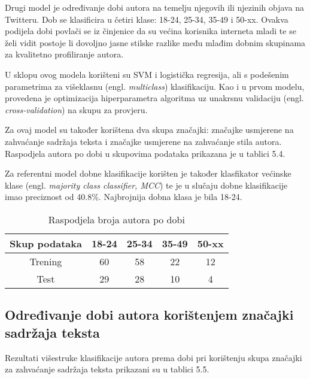 \documentclass[times, utf8, zavrsni]{fer}
\begin{document}
Drugi model je određivanje dobi autora na temelju njegovih ili njezinih objava na Twitteru. Dob se klasificira u četiri klase: 18-24, 25-34, 35-49 i 50-xx. Ovakva podijela dobi povlači se iz činjenice da su većina korisnika interneta mladi te se želi vidit postoje li dovoljno jasne stilske razlike među mlađim dobnim skupinama za kvalitetno profiliranje autora.

 U sklopu ovog modela korišteni su SVM i logistička regresija, ali s podešenim parametrima za višeklasnu (engl. \textit{multiclass}) klasifikaciju. Kao i u prvom modelu, provedena je optimizacija hiperparametra algoritma uz unakrsnu validaciju (engl. \textit{cross-validation}) na skupu za provjeru.

Za ovaj model su također korištena dva skupa značajki: značajke usmjerene na zahvaćanje sadržaja teksta i značajke usmjerene na zahvaćanje stila autora. Raspodjela autora po dobi u skupovima podataka prikazana je u tablici 5.4.\newline

Za referentni model dobne klasifikacije korišten je također klasfikator većinske klase (engl. \textit{majority class classifier, MCC}) te je u slučaju dobne klasifikacije imao preciznost od 40.8\%. Najbrojnija dobna klasa je bila 18-24. 


\begin{table}[h!]
	\centering
	\begin{tabular}{||c |c |c| c| c||} 
		\hline
		Skup podataka & 18-24 & 25-34 & 35-49 & 50-xx \\ [0.5ex] 
		\hline\hline
		Trening & 60 & 58 & 22 & 12 \\ 
		\hline
		Test & 29 & 28 & 10 & 4 \\
		\hline
	\end{tabular}
	\caption{Raspodjela broja autora po dobi}
	\label{Table:1}
\end{table}

\newpage

\subsection*{Određivanje dobi autora korištenjem značajki sadržaja teksta}

Rezultati višestruke klasifikacije autora prema dobi pri korištenju skupa značajki za zahvaćanje sadržaja teksta prikazani su u tablici 5.5.
\end{document}
